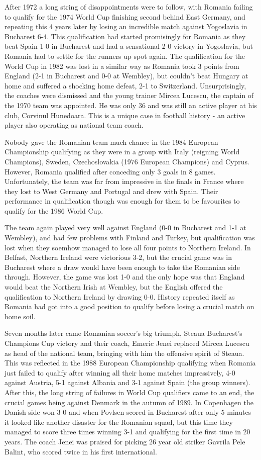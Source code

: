 After 1972 a long string of disappointments were to follow, with Romania 
failing to qualify for the 1974 World Cup finishing second behind East Germany,
and repeating this 4 years later by losing an incredible match against
Yogoslavia in Bucharest 6-4. This qualification had started promisingly for
Romania as they beat Spain 1-0 in Bucharest and had a sensational 2-0 victory 
in Yogoslavia, but Romania had to settle for the runners up spot again. The 
qualification for the World Cup in 1982 was lost in a similar way as Romania
took 3 points from England (2-1 in Bucharest and 0-0 at Wembley), but couldn't
beat Hungary at home and suffered a shocking home defeat, 2-1 to Switzerland.
Unsurprisingly, the coaches were dismissed and the young trainer Mircea 
Lucescu, the captain of the 1970 team was appointed. He was only 36 and was 
still an active player at his club, Corvinul Hunedoara. This is a unique case 
in football history - an active player also operating as national team coach.  

Nobody gave the Romanian team much chance in the 1984 European Championship
qualifying as they were in a group with Italy (reigning World Champions),
Sweden, Czechoslovakia (1976 European Champions) and Cyprus. However, Romania 
qualified after conceding only 3 goals in 8 games. Unfortunately, the team was
far from impressive in the finals in France where they lost to West Germany 
and Portugal and drew with Spain. Their performance in qualification though was
enough for them to be favourites to qualify for the 1986 World Cup.

The team again played very well against England (0-0 in Bucharest and 1-1 at 
Wembley), and had few problems with Finland and Turkey, but qualification was
lost when they soemhow managed to lose all four points to Northern Ireland. In
Belfast, Northern Ireland were victorious 3-2, but the crucial game was in 
Bucharest where a draw would have been enough to take the Romanian side 
through. However, the game was lost 1-0 and the only hope was that England 
would beat the Northern Irish at Wembley, but the English offered the 
qualification to Northern Ireland by drawing 0-0. History repeated itself as
Romania had got into a good position to qualify before losing a crucial match
on home soil.

Seven months later came Romanian soccer's big triumph, Steaua Bucharest's
Champions Cup victory and their coach, Emeric Jenei replaced Mircea Lucescu 
as head of the national team, bringing with him the offensive spirit of Steaua.
This was reflected in the 1988 European Championship qualifying when Romania 
just failed to qualify after winning all their home matches impressively, 4-0 
against Austria, 5-1 against Albania and 3-1 against Spain (the group winners).
After this, the long string of failures in World Cup qualifiers came to an end,
the crucial games being against Denmark in the autumn of 1989. In Copenhagen 
the Danish side won 3-0 and when Povlsen scored in Bucharest after only 5 
minutes it looked like another disaster for the Romanian squad, but this time
they managed to score three times winning 3-1 and qualifying for the first time
in 20 years. The coach Jenei was praised for picking 26 year old striker 
Gavrila Pele Balint, who scored twice in his first international.

